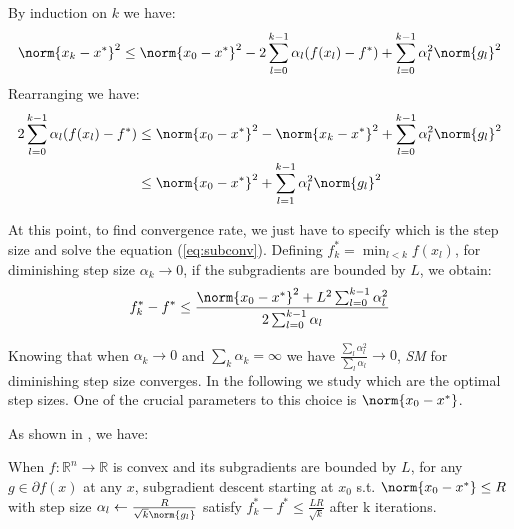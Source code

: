 By induction on $k$ we have:
\begin{align*}
    \norm{x_k - x^*}^2 \leq \norm{x_0 - x^*}^2 - 2\sum_{l=0}^{k-1}\alpha_l(f(x_l)-f^*) + \sum_{l=0}^{k-1}\alpha_l^2\norm{g_l}^2
\end{align*}
Rearranging we have:
\begin{align}
\begin{split}
\label{eq:subconv}
    2\sum_{l=0}^{k-1}\alpha_l(f(x_l) - f^*) &\leq \norm{x_0 - x^*}^2 - \norm{x_k - x^*}^2 + \sum_{l=0}^{k-1}\alpha_l^2\norm{g_l}^2\\
    & \leq \norm{x_0 - x^*}^2 + \sum_{l=1}^{k-1}\alpha_l^2\norm{g_l}^2
\end{split}
\end{align}

At this point, to find convergence rate, we just have to specify which is the step size and solve the equation (\ref{eq:subconv}). Defining $f_k^* = \min_{l<k}f(x_l)$, for diminishing step size $\alpha_k \to 0$, if the subgradients are bounded by $L$, we obtain:
\begin{align*}
    f_k^* - f^* \leq \frac{\norm{x_0 - x^*}^2 + L^2\sum_{l=0}^{k-1}\alpha_l^2}{2\sum_{l=0}^{k-1}\alpha_l}
\end{align*}

Knowing that when $\alpha_k \to 0$ and $\sum_k \alpha_k = \infty$ we have $\frac{\sum_l\alpha_l^2}{\sum_l\alpha_l} \to 0$, \textit{SM} for diminishing step size converges. In the following we study which are the optimal step sizes. One of the crucial parameters to this choice is $\norm{x_0 - x^*}$.

As shown in \parencite[Theorem 3.1]{notes_subgrad}, we have:
\begin{thm}
When $f:\mathbb{R}^n\to\mathbb{R}$ is convex and its subgradients are bounded by $L$, for any $g \in \partial f(x)$ at any $x$, subgradient descent starting at $x_0$ s.t. $\norm{x_0 - x^*} \leq R$ with step size $\alpha_l \leftarrow \frac{R}{\sqrt{k}\norm{g_l}}$ satisfy $f^*_k - f^* \leq \frac{LR}{\sqrt{k}}$ after k iterations.
\end{thm}



